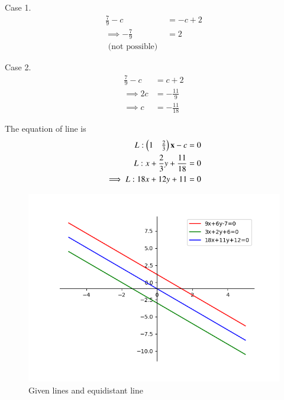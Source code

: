\documentclass[journal,12pt,twocolumn]{IEEEtran}
\renewcommand{\vec}[1]{\boldsymbol{\mathbf{#1}}}
\begin{document}
Case 1.
\begin{align}
	\frac{7}{9} - {c} &= -{c} + 2\\
    \implies -\frac{7}{9} &= 2\\
    \text{ (not possible) } 
\end{align}

Case 2.
\begin{align}
    \frac{7}{9} - {c} &= {c} + 2\\
    \implies 2{c} &= -\frac{11}{9}\\
    \implies {c} &= -\frac{11}{18}
\end{align}

The equation of line is
\begin{align}
    {L}: \myvec{1&\frac{2}{3}}\vec{x} - c &= 0\\
    {L}: {x} + \frac{2}{3}{y} + \frac{11}{18} &= 0 \\
    \implies {L}: 18{x} + 12{y} + 11 &= 0
\end{align}

\begin{figure}[!htb]
    \centering
    \includegraphics[width=\columnwidth]{figs/line.png}
    \caption{Given lines and equidistant line}
    \label{fig:line}
\end{figure}
\end{document}
